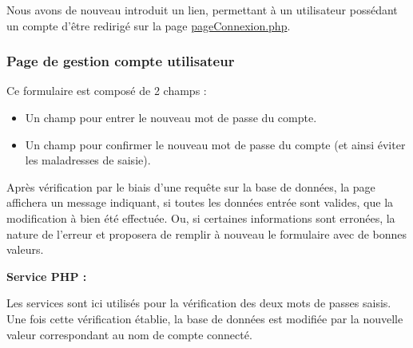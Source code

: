 
        \newpage
        
            \begin{paragraphe}
                Nous avons de nouveau introduit un lien, permettant à un utilisateur possédant un compte d'être redirigé sur la page \underline{pageConnexion.php}.
            \end{paragraphe}


    \clearpage

		\subsubsection{Page de gestion compte utilisateur}

			\begin{paragraphe}
				Ce formulaire est composé de 2 champs :
				\begin{itemize}
					\item Un champ pour entrer le nouveau mot de passe du compte.
					\item Un champ pour confirmer le nouveau mot de passe du compte (et ainsi éviter les maladresses de saisie).
				\end{itemize}
			\end{paragraphe}

			\begin{paragraphe}
				Après vérification par le biais d'une requête sur la base de données, la page affichera un message indiquant, si toutes les données entrée sont valides, que la modification à bien été effectuée. Ou, si certaines informations sont erronées, la nature de l'erreur et proposera de remplir à nouveau le formulaire avec de bonnes valeurs.
			\end{paragraphe}

			\begin{paragraphe}
				\textbf{Service PHP :}
			\end{paragraphe}

			\begin{paragraphe}
				Les services sont ici utilisés pour la vérification des deux mots de passes saisis. \\
				Une fois cette vérification établie, la base de données est modifiée par la nouvelle valeur correspondant au nom de compte connecté.
			\end{paragraphe}


